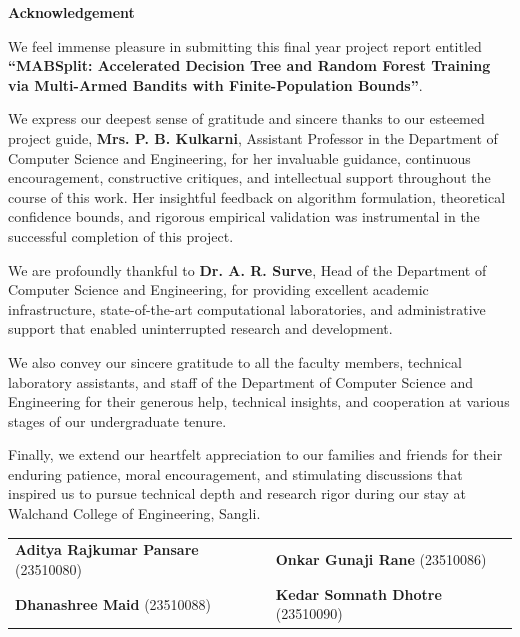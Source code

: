 \documentclass{article}
\begin{document}
	\begin{center}
	\Huge \textbf{\color{blue}Acknowledgement} \\
	\end{center}
	\vspace{0.8cm}
	{
	\onehalfspacing
	\setlength{\parindent}{2em}
	\setlength{\parskip}{0.8em}

We feel immense pleasure in submitting this final year project report entitled \textbf{``MABSplit: Accelerated Decision Tree and Random Forest Training via Multi-Armed Bandits with Finite-Population Bounds''}.

We express our deepest sense of gratitude and sincere thanks to our esteemed project guide, \textbf{Mrs. P. B. Kulkarni}, Assistant Professor in the Department of Computer Science and Engineering, for her invaluable guidance, continuous encouragement, constructive critiques, and intellectual support throughout the course of this work. Her insightful feedback on algorithm formulation, theoretical confidence bounds, and rigorous empirical validation was instrumental in the successful completion of this project.

We are profoundly thankful to \textbf{Dr. A. R. Surve}, Head of the Department of Computer Science and Engineering, for providing excellent academic infrastructure, state-of-the-art computational laboratories, and administrative support that enabled uninterrupted research and development.

We also convey our sincere gratitude to all the faculty members, technical laboratory assistants, and staff of the Department of Computer Science and Engineering for their generous help, technical insights, and cooperation at various stages of our undergraduate tenure.

Finally, we extend our heartfelt appreciation to our families and friends for their enduring patience, moral encouragement, and stimulating discussions that inspired us to pursue technical depth and research rigor during our stay at Walchand College of Engineering, Sangli.

	\vspace{1.5cm}
	\noindent
	\begin{tabular}{p{}p{}}
	\textbf{Aditya Rajkumar Pansare} (23510080) & \textbf{Onkar Gunaji Rane} (23510086) \\[0.15in]
	\textbf{Dhanashree Maid} (23510088) & \textbf{Kedar Somnath Dhotre} (23510090) \\
	\end{tabular}
	}
	
\end{document}
